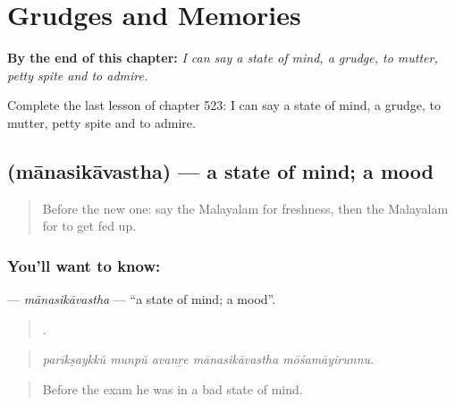 
\chapter{Grudges and Memories}
\label{ch:ml-grudges-and-memories}

\begin{chapteropening}
\textbf{By the end of this chapter:} \emph{I can say a state of mind, a grudge, to mutter, petty spite and to admire.}

Complete the last lesson of chapter 523: I can say a state of mind, a grudge, to mutter, petty spite and to admire.
\end{chapteropening}

\section[\texorpdfstring{\ml{മാനസികാവസ്ഥ} (mānasikāvastha)}{മാനസികാവസ്ഥ (mānasikāvastha)}]{ (mānasikāvastha) — a state of mind; a mood}

\label{lesson:ML-C523-manasikavastha}



\begin{quote}
Before the new one: say the Malayalam for freshness, then the Malayalam for to get fed up.
\end{quote}

\subsection*{You'll want to know: }
\textbf{} — \emph{mānasikāvastha} — \textquotedblleft{}a state of mind; a mood\textquotedblright{}.

\begin{quote}
    .
\end{quote}

\begin{quote}
\emph{parīkṣaykkŭ munpŭ avanṟe mānasikāvastha mōśamāyirunnu.}
\end{quote}

\begin{quote}
Before the exam he was in a bad state of mind.
\end{quote}

